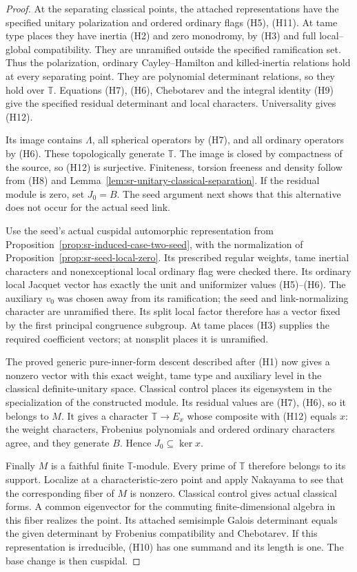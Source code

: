 \begin{proof}
At the separating classical points, the attached
representations have the specified unitary polarization
and ordered ordinary flags (H5), (H11).
At tame type places they have inertia (H2) and zero
monodromy, by (H3) and full local--global compatibility.
They are unramified outside the specified ramification set.
Thus the polarization, ordinary Cayley--Hamilton and
killed-inertia relations hold at every separating point.
They are polynomial determinant relations, so they hold
over \(\mathbb T\).
Equations (H7), (H6), Chebotarev and the integral identity
(H9) give the specified residual determinant and local
characters. Universality gives (H12).

Its image contains \(\Lambda\), all spherical operators
by (H7), and all ordinary operators by (H6).
These topologically generate \(\mathbb T\).
The image is closed by compactness of the source,
so (H12) is surjective.
Finiteness, torsion freeness and density follow from
(H8) and Lemma~\ref{lem:sr-unitary-classical-separation}.
If the residual module is zero, set \(J_0=B\).
The seed argument next shows that this alternative
does not occur for the actual seed link.

Use the seed's actual cuspidal automorphic representation
from Proposition~\ref{prop:sr-induced-case-two-seed},
with the normalization of
Proposition~\ref{prop:sr-seed-local-zero}.
Its prescribed regular weights, tame inertial characters
and nonexceptional local ordinary flag were checked there.
Its ordinary local Jacquet vector has exactly the unit
and uniformizer values (H5)--(H6).
The auxiliary \(v_0\) was chosen away from its ramification;
the seed and link-normalizing character are unramified
there. Its split local factor therefore has a vector fixed
by the first principal congruence subgroup.
At tame places (H3) supplies the required coefficient
vectors; at nonsplit places it is unramified.

The proved generic pure-inner-form descent described
after (H1) now gives a nonzero vector with this exact
weight, tame type and auxiliary level in the classical
definite-unitary space.
Classical control places its eigensystem in the
specialization of the constructed module.
Its residual values are (H7), (H6), so it belongs to \(M\).
It gives a character \(\mathbb T\to E_x\) whose composite
with (H12) equals \(x\):
the weight characters, Frobenius polynomials and ordered
ordinary characters agree, and they generate \(B\).
Hence \(J_0\subseteq\ker x\).

Finally \(M\) is a faithful finite \(\mathbb T\)-module.
Every prime of \(\mathbb T\) therefore belongs to its
support. Localize at a characteristic-zero point and
apply Nakayama to see that the corresponding fiber of
\(M\) is nonzero.
Classical control gives actual classical forms.
A common eigenvector for the commuting finite-dimensional
algebra in this fiber realizes the point.
Its attached semisimple Galois determinant equals the
given determinant by Frobenius compatibility and
Chebotarev. If this representation is irreducible,
(H10) has one summand and its length is one.
The base change is then cuspidal.
\end{proof}


